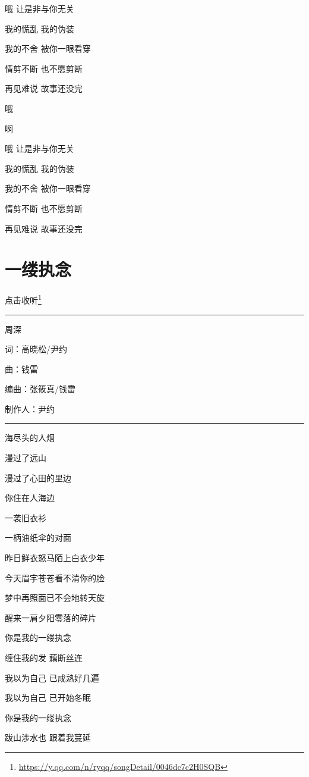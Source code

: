 \documentclass[]{ctexbook}
\renewcommand{\href}[2]{#2\footnote{\url{#1}}}
\begin{document}
哦 让是非与你无关

我的慌乱 我的伪装

我的不舍 被你一眼看穿

情剪不断 也不愿剪断

再见难说 故事还没完

哦

啊

哦 让是非与你无关

我的慌乱 我的伪装

我的不舍 被你一眼看穿

情剪不断 也不愿剪断

再见难说 故事还没完

\section*{一缕执念}\label{a-wisp-of-obsession}


\href{https://y.qq.com/n/ryqq/songDetail/0046dc7c2H0SQB}{点击收听}

\begin{center}\rule{0.5\linewidth}{0.5pt}\end{center}

周深

词：高晓松/尹约

曲：钱雷

编曲：张筱真/钱雷

制作人：尹约

\begin{center}\rule{0.5\linewidth}{0.5pt}\end{center}

海尽头的人烟

漫过了远山

漫过了心田的里边

你住在人海边

一袭旧衣衫

一柄油纸伞的对面

昨日鲜衣怒马陌上白衣少年

今天眉宇苍苍看不清你的脸

梦中再照面已不会地转天旋

醒来一肩夕阳零落的碎片

你是我的一缕执念

缠住我的发 藕断丝连

我以为自己 已成熟好几遍

我以为自己 已开始冬眠

你是我的一缕执念

跋山涉水也 跟着我蔓延
\end{document}
